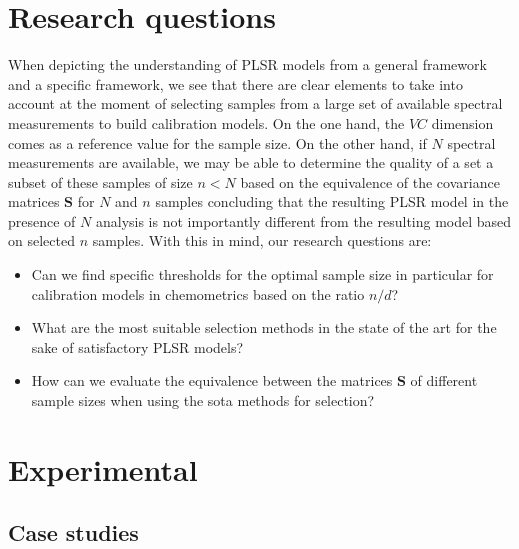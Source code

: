 \documentclass[journal=ancham,manuscript=article]{achemso}
\begin{document}

\section*{Research questions}

When depicting the understanding of PLSR models from a general framework and a specific framework, we see that there are clear elements to take into account at the moment of selecting samples from a large set of available spectral measurements to build calibration models. On the one hand, the $VC$ dimension comes as a reference value for the sample size. On the other hand, if $N$ spectral measurements are available, we may be able to determine the quality of a set a subset of these samples of size $n<N$ based on the equivalence of the covariance matrices $\mathbf{S}$ for $N$ and $n$ samples concluding that the resulting PLSR model in the presence of $N$ analysis is not importantly different from the resulting model based on selected $n$ samples. With this in mind, our research questions are:

\begin{itemize}
    \item Can we find specific thresholds for the optimal sample size in particular for calibration models in chemometrics based on the ratio $n/d$?
    \item What are the most suitable selection methods in the state of the art for the sake of satisfactory PLSR models?
    \item How can we evaluate the equivalence between the matrices $\mathbf{S}$ of different sample sizes when using the sota methods for selection?
\end{itemize}


\section*{Experimental}\label{experimental}

\subsection*{Case studies}\label{data}
\end{document}
